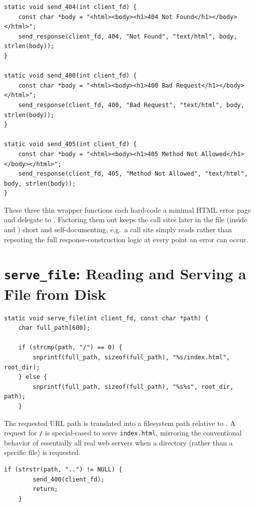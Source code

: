 \begin{lstlisting}[style=cstyle]
static void send_404(int client_fd) {
    const char *body = "<html><body><h1>404 Not Found</h1></body></html>";
    send_response(client_fd, 404, "Not Found", "text/html", body, strlen(body));
}

static void send_400(int client_fd) {
    const char *body = "<html><body><h1>400 Bad Request</h1></body></html>";
    send_response(client_fd, 400, "Bad Request", "text/html", body, strlen(body));
}

static void send_405(int client_fd) {
    const char *body = "<html><body><h1>405 Method Not Allowed</h1></body></html>";
    send_response(client_fd, 405, "Method Not Allowed", "text/html", body, strlen(body));
}
\end{lstlisting}

These three thin wrapper functions each hard-code a minimal HTML error page and delegate to . Factoring them out keeps the call sites later in the file (inside  and ) short and self-documenting, e.g.\ a call site simply reads  rather than repeating the full response-construction logic at every point an error can occur.

\section{\texttt{serve\_file}: Reading and Serving a File from Disk}

\begin{lstlisting}[style=cstyle]
static void serve_file(int client_fd, const char *path) {
    char full_path[600];

    if (strcmp(path, "/") == 0) {
        snprintf(full_path, sizeof(full_path), "%s/index.html", root_dir);
    } else {
        snprintf(full_path, sizeof(full_path), "%s%s", root_dir, path);
    }
\end{lstlisting}

The requested URL path is translated into a filesystem path relative to . A request for \texttt{/} is special-cased to serve \texttt{index.html}, mirroring the conventional behavior of essentially all real web servers when a directory (rather than a specific file) is requested.

\begin{lstlisting}[style=cstyle]
    if (strstr(path, "..") != NULL) {
        send_400(client_fd);
        return;
    }
\end{lstlisting}

